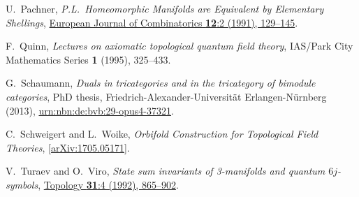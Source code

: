 \documentclass[12pt]{scrartcl}
\newcommand\doi[2]        {\href{http://dx.doi.org/#1}{#2}}
\theoremstyle{definition}
\numberwithin{equation}{section}
\numberwithin{definition}{section}
\numberwithin{figure}{section}
\begin{document}
\begin{thebibliography}{BDSPV}
U.~Pachner, 
\textsl{P.L.~Homeomorphic Manifolds are Equivalent by Elementary Shellings}, 
\doi{10.1016/S0195-6698(13)80080-7}{European Journal of Combinatorics \textbf{12}:2 (1991), 129--145}. 

F.~Quinn, 
\textsl{Lectures on axiomatic topological quantum field theory}, 
IAS/Park City Mathematics Series \textbf{1} (1995), 325--433.

G.~Schaumann, 
\textsl{Duals in tricategories and in the tricategory of bimodule categories}, 
PhD thesis, 
Friedrich-Alexander-Universit\"at Erlangen-N\"urnberg (2013), 
\href{http://nbn-resolving.de/urn/resolver.pl?urn:nbn:de:bvb:29-opus4-37321}{urn:nbn:de:bvb:29-opus4-37321}.

C.~Schweigert and L.~Woike,
\textsl{Orbifold Construction for Topological Field Theories}, 
\href{http://arxiv.org/abs/1705.05171}{[arXiv:1705.05171]}.

V.~Turaev and O.~Viro, 
\textsl{State sum invariants of 3-manifolds and quantum $6j$-symbols}, 
\doi{10.1016/0040-9383(92)90015-A}{Topology \textbf{31}:4 (1992), 865--902}.

\end{thebibliography}
\end{document}
